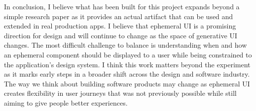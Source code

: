 In conclusion, I believe what has been built for this project expands beyond a simple research paper as it provides an actual artifact that can be used and extended in real production apps. I believe that ephemeral UI is a promising direction for design and will continue to change as the space of generative UI changes. The most difficult challenge to balance is understanding when and how an ephemeral component should be displayed to a user while being constrained to the application's design system. I think this work matters beyond the experiment as it marks early steps in a broader shift across the design and software industry. The way we think about building software products may change as ephemeral UI creates flexibility in user journeys that was not previously possible while still aiming to give people better experiences.